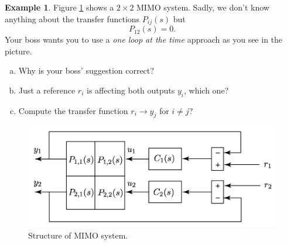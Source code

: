 \documentclass[a4paper,12 pt]{article}
\numberwithin{equation}{section}
\theoremstyle{definition}
\newtheorem{bsp}{Example}
\theoremstyle{remark}
\theoremstyle{definition}
\theoremstyle{definition}
\theoremstyle{definition}
\theoremstyle{remark}
\begin{document}
\newpage

\begin{bsp}
Figure \ref{fig:rgabsp} shows a $2\times 2$ MIMO system. Sadly, we don't know anything about the transfer functions $P_{ij}(s)$ but 
$$P_{12}(s)=0.$$
Your boss wants you to use a \textit{one loop at the time} approach as you see in the picture.
\begin{enumerate}[(a)]
\item Why is your boss' suggestion correct?
\item Just a reference $r_i$ is affecting both outputs $y_i$, which one?
\item Compute the transfer function $r_i\rightarrow y_j$ for $i\neq j$?
\end{enumerate}

\begin{figure}[ht]
\begin{center}
\includegraphics[width=0.7\columnwidth]{rgabsp}
\caption{Structure of MIMO system.}
\label{fig:rgabsp}
\end{center}
\end{figure}
\newpage


\end{bsp}
\end{document}
